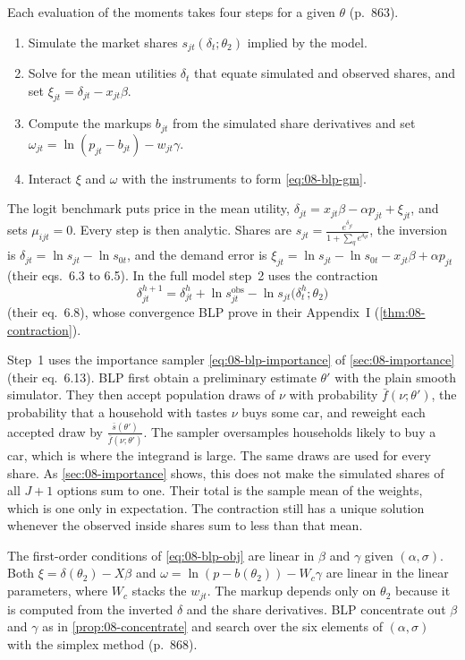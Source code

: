 Each evaluation of the moments takes four steps for a given $\theta$ (p.~863).
\begin{enumerate}
\item Simulate the market shares $s_{jt}(\delta_t;\theta_2)$ implied by the model.
\item Solve for the mean utilities $\delta_t$ that equate simulated and observed shares, and set
  $\xi_{jt}=\delta_{jt}-x_{jt}\beta$.
\item Compute the markups $b_{jt}$ from the simulated share derivatives and set
  $\omega_{jt}=\ln(p_{jt}-b_{jt})-w_{jt}\gamma$.
\item Interact $\xi$ and $\omega$ with the instruments to form \eqref{eq:08-blp-gm}.
\end{enumerate}
The logit benchmark puts price in the mean utility, $\delta_{jt}=x_{jt}\beta-\alpha p_{jt}+\xi_{jt}$, and
sets $\mu_{ijt}=0$. Every step is then analytic. Shares are
$s_{jt}=\frac{e^{\delta_{jt}}}{1+\sum_qe^{\delta_{qt}}}$, the inversion is
$\delta_{jt}=\ln s_{jt}-\ln s_{0t}$, and the demand error is
$\xi_{jt}=\ln s_{jt}-\ln s_{0t}-x_{jt}\beta+\alpha p_{jt}$ (their eqs.~6.3 to 6.5). In the full model
step~2 uses the contraction
\begin{equation*}
\delta_{jt}^{h+1}=\delta_{jt}^{h}+\ln s^{\text{obs}}_{jt}-\ln s_{jt}\big(\delta_t^{h};\theta_2\big)
\end{equation*}
(their eq.~6.8), whose convergence BLP prove in their Appendix~I (\cref{thm:08-contraction}).

Step~1 uses the importance sampler \eqref{eq:08-blp-importance} of \cref{sec:08-importance} (their
eq.~6.13). BLP first obtain a preliminary estimate $\theta'$ with the plain smooth simulator. They then
accept population draws of $\nu$ with probability $\bar f(\nu;\theta')$, the probability that a household
with tastes $\nu$ buys some car, and reweight each accepted draw by $\frac{\bar s(\theta')}{\bar
f(\nu;\theta')}$. The sampler oversamples households likely to buy a car, which is where the integrand is
large. The same draws are used for every share. As \cref{sec:08-importance} shows, this does not make the
simulated shares of all $J+1$ options sum to one. Their total is the sample mean of the weights, which is
one only in expectation. The contraction still has a unique solution whenever the observed inside shares
sum to less than that mean.

The first-order conditions of \eqref{eq:08-blp-obj} are linear in $\beta$ and $\gamma$ given
$(\alpha,\sigma)$. Both $\xi=\delta(\theta_2)-X\beta$ and $\omega=\ln(p-b(\theta_2))-W_c\gamma$ are linear
in the linear parameters, where $W_c$ stacks the $w_{jt}$. The markup depends only on $\theta_2$ because
it is computed from the inverted $\delta$ and the share derivatives. BLP concentrate out $\beta$ and
$\gamma$ as in \cref{prop:08-concentrate} and search over the six elements of $(\alpha,\sigma)$ with the
\citet{NelderMead1965} simplex method (p.~868).

